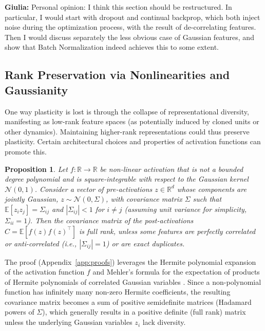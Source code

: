 \documentclass{article}
\newcommand{\R}{\mathbb{R}}
\newcommand{\E}{\mathbb{E}}
\newcommand{\giulia}[1]{{\color{ForestGreen}\textbf{Giulia:} #1}}
\newtheorem{proposition}{Proposition}[section]
\begin{document}
\giulia{Personal opinion: I think this section should be restructured. In particular, I would start with dropout and continual backprop, which both inject noise during the optimization process, with the result of de-correlating features. Then I would discuss separately the less obvious case of Gaussian features, and show that Batch Normalization indeed achieves this to some extent.}

\subsection{Rank Preservation via Nonlinearities and Gaussianity}

One way plasticity is lost is through the collapse of representational diversity, manifesting as low-rank feature spaces (as potentially induced by cloned units or other dynamics). Maintaining higher-rank representations could thus preserve plasticity. Certain architectural choices and properties of activation functions can promote this.

\begin{proposition}
\label{prop:rank}
Let $f:\R\to\R$ be non-linear activation that is not a bounded degree polynomial and is square-integrable with respect to the Gaussian kernel $\mathcal{N}(0,1)$. Consider a vector of pre-activations $z\in\R^d$ whose components are jointly Gaussian, $z \sim \mathcal{N}(0, \Sigma)$, with covariance matrix $\Sigma$ such that $\E[z_i z_j]=\Sigma_{ij}$ and $|\Sigma_{ij}|<1$ for $i \neq j$ (assuming unit variance for simplicity, $\Sigma_{ii}=1$). Then the covariance matrix of the post-activations $C = \E[f(z)f(z)^\top]$ is full rank, unless some features are perfectly correlated or anti-correlated (i.e., $|\Sigma_{ij}|=1$) or are exact duplicates.
\end{proposition}

The proof (Appendix~\ref{app:proofs}) leverages the Hermite polynomial expansion of the activation function $f$ \cite{erdelyi1953higher} and Mehler's formula for the expectation of products of Hermite polynomials of correlated Gaussian variables \cite{mehler1866ueber, erdelyi1953higher}. Since a non-polynomial function has infinitely many non-zero Hermite coefficients, the resulting covariance matrix becomes a sum of positive semidefinite matrices (Hadamard powers of $\Sigma$), which generally results in a positive definite (full rank) matrix unless the underlying Gaussian variables $z_i$ lack diversity.
\end{document}
